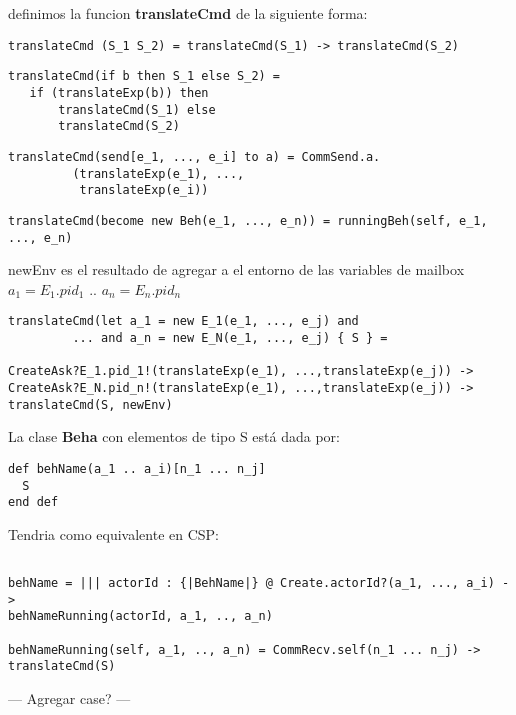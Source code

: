 \documentclass[fleqn]{article}
\begin{document}
definimos la funcion \textbf{translateCmd} de la siguiente forma:

\begin{verbatim}
translateCmd (S_1 S_2) = translateCmd(S_1) -> translateCmd(S_2)
\end{verbatim}


\begin{verbatim}
translateCmd(if b then S_1 else S_2) = 
   if (translateExp(b)) then
       translateCmd(S_1) else 
       translateCmd(S_2)
\end{verbatim}

\begin{verbatim}
translateCmd(send[e_1, ..., e_i] to a) = CommSend.a.
         (translateExp(e_1), ..., 
          translateExp(e_i)) 
\end{verbatim}

\begin{verbatim}
translateCmd(become new Beh(e_1, ..., e_n)) = runningBeh(self, e_1, ..., e_n)
\end{verbatim}

newEnv es el resultado de agregar a el entorno de las variables de mailbox $a_1
= E_1.pid_1$ .. $a_n = E_n.pid_n$
\begin{verbatim}
translateCmd(let a_1 = new E_1(e_1, ..., e_j) and 
         ... and a_n = new E_N(e_1, ..., e_j) { S } = 

CreateAsk?E_1.pid_1!(translateExp(e_1), ...,translateExp(e_j)) ->
CreateAsk?E_N.pid_n!(translateExp(e_1), ...,translateExp(e_j)) ->
translateCmd(S, newEnv)
\end{verbatim}


La clase \textbf{Beha} con elementos de tipo S está dada por:

\begin{verbatim}
def behName(a_1 .. a_i)[n_1 ... n_j]
  S
end def
\end{verbatim}

Tendria como equivalente en CSP:

\begin{verbatim}

behName = ||| actorId : {|BehName|} @ Create.actorId?(a_1, ..., a_i) ->
behNameRunning(actorId, a_1, .., a_n)

behNameRunning(self, a_1, .., a_n) = CommRecv.self(n_1 ... n_j) -> translateCmd(S)

\end{verbatim}

--- Agregar case? ---


{}

\end{document}

